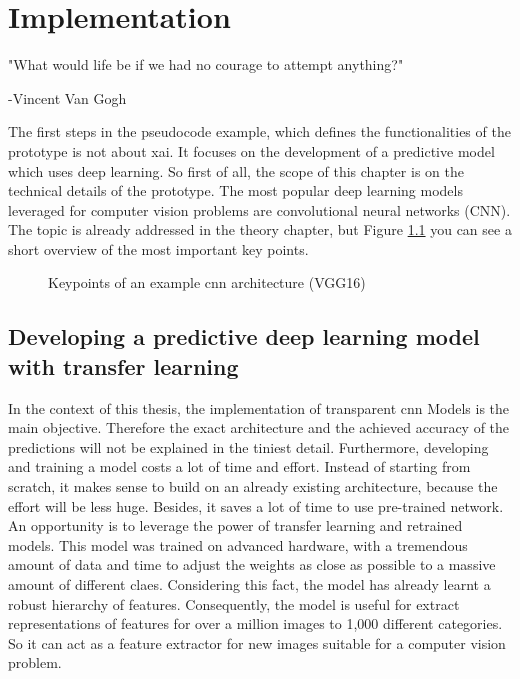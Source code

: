 
\chapter{Implementation}
\label{ch:it_specifications}
\epigraph{"What would life be if we had no courage to attempt anything?"}{-Vincent Van Gogh}

The first steps in the pseudocode example, which defines the functionalities of the prototype is not about \gls{xai}. It focuses on the development of a predictive model which uses deep learning. So first of all, the scope of this chapter is on the technical details of the prototype. The most popular deep learning models leveraged for computer vision problems are convolutional neural networks (CNN). The topic is already addressed in the theory chapter, but Figure \ref{fig:cnn_summary} you can see a short overview of the most important key points.

\begin{figure}[htp]
	\centering
	\caption{Keypoints of an example cnn architecture (VGG16)}
	\label{fig:cnn_summary}
\end{figure}

\section{Developing a predictive deep learning model with transfer learning}

In the context of this thesis, the implementation of transparent \gls{cnn} Models is the main objective. Therefore the exact architecture and the achieved accuracy of the predictions will not be explained in the tiniest detail. Furthermore, developing and training a model costs a lot of time and effort. Instead of starting from scratch, it makes sense to build on an already existing architecture, because the effort will be less huge. Besides, it saves a lot of time to use pre-trained network.\\

An opportunity is to leverage the power of transfer learning and retrained models. This model was trained on advanced hardware, with a tremendous amount of data and time to adjust the weights as close as possible to a massive amount of different claes. Considering this fact, the model has already learnt a robust hierarchy of features. Consequently, the model is useful for extract representations of features for over a million images to 1,000 different categories. So it can act as a  feature extractor for new images suitable for a computer vision problem.\\

